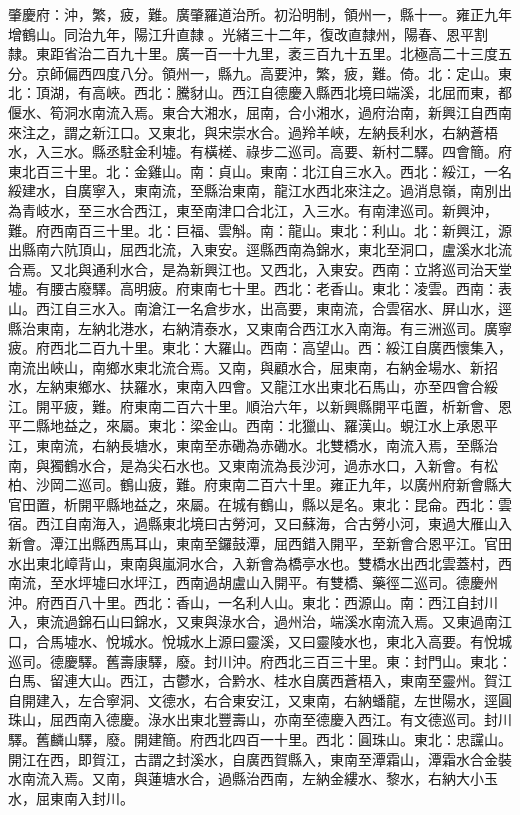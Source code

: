 \begin{pinyinscope}
肇慶府：沖，繁，疲，難。廣肇羅道治所。初沿明制，領州一，縣十一。雍正九年增鶴山。同治九年，陽江升直隸。光緒三十二年，復改直隸州，陽春、恩平割隸。東距省治二百九十里。廣一百一十九里，袤三百九十五里。北極高二十三度五分。京師偏西四度八分。領州一，縣九。高要沖，繁，疲，難。倚。北：定山。東北：頂湖，有高峽。西北：騰豺山。西江自德慶入縣西北境曰端溪，北屈而東，都偃水、筍洞水南流入焉。東合大湘水，屈南，合小湘水，過府治南，新興江自西南來注之，謂之新江口。又東北，與宋崇水合。過羚羊峽，左納長利水，右納蒼梧水，入三水。縣丞駐金利墟。有橫槎、祿步二巡司。高要、新村二驛。四會簡。府東北百三十里。北：金雞山。南：貞山。東南：北江自三水入。西北：綏江，一名綏建水，自廣寧入，東南流，至縣治東南，龍江水西北來注之。過消息嶺，南別出為青岐水，至三水合西江，東至南津口合北江，入三水。有南津巡司。新興沖，難。府西南百三十里。北：巨福、雲斛。南：龍山。東北：利山。北：新興江，源出縣南六阬頂山，屈西北流，入東安。逕縣西南為錦水，東北至洞口，盧溪水北流合焉。又北與通利水合，是為新興江也。又西北，入東安。西南：立將巡司治天堂墟。有腰古廢驛。高明疲。府東南七十里。西北：老香山。東北：凌雲。西南：表山。西江自三水入。南滄江一名倉步水，出高要，東南流，合雲宿水、屏山水，逕縣治東南，左納北港水，右納清泰水，又東南合西江水入南海。有三洲巡司。廣寧疲。府西北二百九十里。東北：大羅山。西南：高望山。西：綏江自廣西懷集入，南流出峽山，南鄉水東北流合焉。又南，與顧水合，屈東南，右納金場水、新招水，左納東鄉水、扶羅水，東南入四會。又龍江水出東北石馬山，亦至四會合綏江。開平疲，難。府東南二百六十里。順治六年，以新興縣開平屯置，析新會、恩平二縣地益之，來屬。東北：梁金山。西南：北獵山、羅漢山。蜆江水上承恩平江，東南流，右納長塘水，東南至赤磡為赤磡水。北雙橋水，南流入焉，至縣治南，與獨鶴水合，是為尖石水也。又東南流為長沙河，過赤水口，入新會。有松柏、沙岡二巡司。鶴山疲，難。府東南二百六十里。雍正九年，以廣州府新會縣大官田置，析開平縣地益之，來屬。在城有鶴山，縣以是名。東北：昆侖。西北：雲宿。西江自南海入，過縣東北境曰古勞河，又曰蘇海，合古勞小河，東過大雁山入新會。潭江出縣西馬耳山，東南至鑼鼓潭，屈西錯入開平，至新會合恩平江。官田水出東北嶂背山，東南與嵐洞水合，入新會為橋亭水也。雙橋水出西北雲蓋村，西南流，至水坪墟曰水坪江，西南過胡盧山入開平。有雙橋、藥徑二巡司。德慶州沖。府西百八十里。西北：香山，一名利人山。東北：西源山。南：西江自封川入，東流過錦石山曰錦水，又東與淥水合，過州治，端溪水南流入焉。又東過南江口，合馬墟水、悅城水。悅城水上源曰靈溪，又曰靈陵水也，東北入高要。有悅城巡司。德慶驛。舊壽康驛，廢。封川沖。府西北三百三十里。東：封門山。東北：白馬、留連大山。西江，古鬱水，合黔水、桂水自廣西蒼梧入，東南至靈州。賀江自開建入，左合寧洞、文德水，右合東安江，又東南，右納蟠龍，左世陽水，逕圓珠山，屈西南入德慶。淥水出東北豐壽山，亦南至德慶入西江。有文德巡司。封川驛。舊麟山驛，廢。開建簡。府西北四百一十里。西北：圓珠山。東北：忠讜山。開江在西，即賀江，古謂之封溪水，自廣西賀縣入，東南至潭霜山，潭霜水合金裝水南流入焉。又南，與蓮塘水合，過縣治西南，左納金縷水、黎水，右納大小玉水，屈東南入封川。


\end{pinyinscope}
